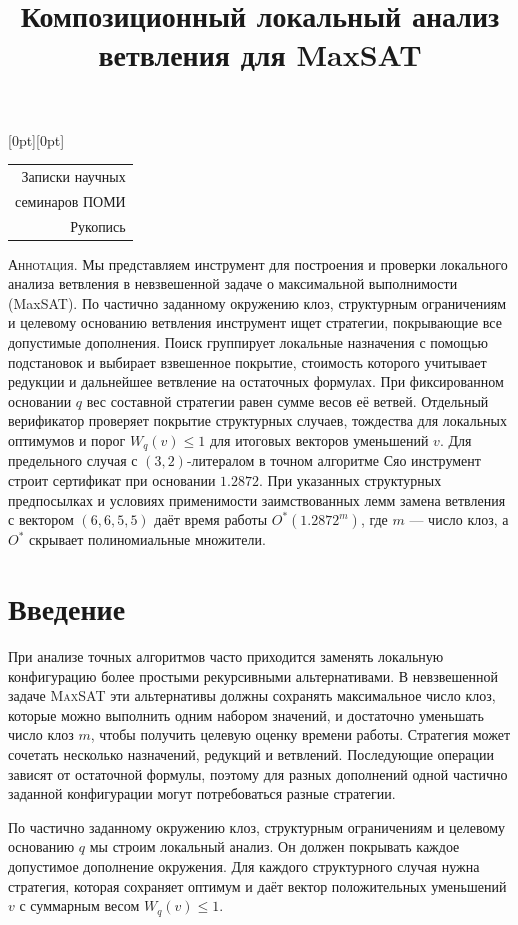 \documentclass[10pt,twoside]{article}
\title{Композиционный локальный анализ ветвления для MaxSAT}
\author{}
\date{}
\makeatletter
\newcommand{\MaxSAT}{\textnormal{\textsc{MaxSAT}}}
\newcommand{\OhStar}{O^*}
\theoremstyle{definition}
\theoremstyle{remark}
\renewcommand{\maketitle}{%
  \thispagestyle{plain}%
  \noindent\hfill\raisebox{0pt}[0pt][0pt]{%
    \begin{tabular}[b]{@{}r@{}}\footnotesize
      Записки научных\\[-1pt]
      семинаров ПОМИ\\[-1pt]
      Рукопись
    \end{tabular}}%
  \par\vspace{1.2em}%
  {\raggedright
    \noindent\hspace*{\parindent}\textbf{\@author}\par\smallskip
    \noindent\hspace*{\parindent}\parbox[t]{0.88\linewidth}{%
      \raggedright\bfseries\MakeUppercase{\@title}}\par}%
  \medskip
}
\renewenvironment{abstract}
  {\footnotesize\list{}{\setlength{\leftmargin}{3pc}\setlength{\rightmargin}{3pc}}%
   \item\relax\textsc{Аннотация.}\enspace}
  {\endlist}
\makeatother
\begin{document}
\maketitle

\begin{abstract}
Мы представляем инструмент для построения и проверки локального анализа
ветвления в невзвешенной задаче о максимальной выполнимости (MaxSAT).
По частично заданному окружению клоз, структурным ограничениям и целевому
основанию ветвления инструмент ищет стратегии, покрывающие все допустимые
дополнения. Поиск группирует локальные назначения с помощью подстановок и
выбирает взвешенное покрытие, стоимость которого учитывает редукции и
дальнейшее ветвление на остаточных формулах. При фиксированном основании
$q$ вес составной стратегии равен сумме весов её ветвей.
Отдельный верификатор проверяет покрытие
структурных случаев, тождества для локальных оптимумов и порог
$W_q(v)\le 1$ для итоговых векторов уменьшений $v$. Для предельного
случая с $(3,2)$-литералом в точном алгоритме Сяо инструмент строит
сертификат при основании $1.2872$.
При указанных структурных предпосылках и условиях применимости заимствованных
лемм замена ветвления с вектором $(6,6,5,5)$ даёт время работы
$\OhStar(1.2872^m)$, где $m$ --- число клоз, а $\OhStar$ скрывает
полиномиальные множители.
\end{abstract}

\begin{NoHyper}
\renewcommand{\thefootnote}{}
\end{NoHyper}

\section{Введение}
\label{sec:introduction}

При анализе точных алгоритмов часто приходится заменять локальную
конфигурацию более простыми рекурсивными альтернативами. В невзвешенной
задаче \MaxSAT{} эти альтернативы должны сохранять максимальное число
клоз, которые можно выполнить одним набором значений, и достаточно
уменьшать число клоз $m$, чтобы получить целевую оценку времени работы.
Стратегия может сочетать несколько
назначений, редукций и ветвлений. Последующие операции зависят от остаточной
формулы, поэтому для разных дополнений одной частично заданной конфигурации
могут потребоваться разные стратегии.

По частично заданному окружению клоз, структурным ограничениям и целевому
основанию $q$ мы строим локальный анализ. Он должен покрывать каждое
допустимое дополнение окружения. Для каждого структурного случая нужна
стратегия, которая сохраняет оптимум и даёт вектор положительных
уменьшений $v$ с суммарным весом $W_q(v)\le 1$.
\end{document}
